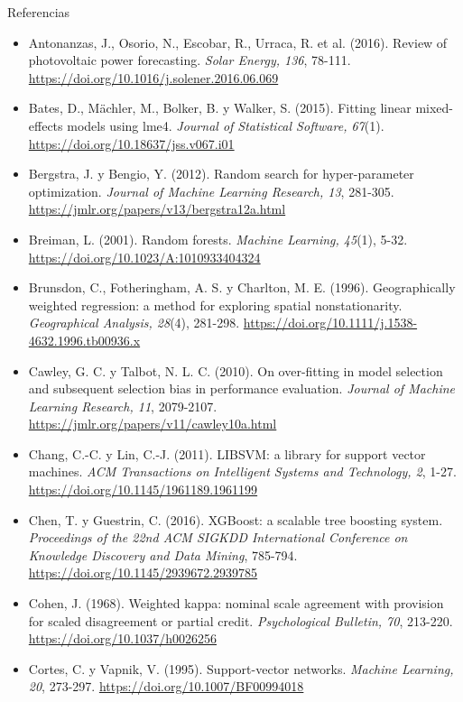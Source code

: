 \documentclass[aspectratio=169,10pt]{beamer}
\begin{document}
\begin{frame}[allowframebreaks]{Referencias}
  \tiny
  \begin{itemize}
    \item Antonanzas, J., Osorio, N., Escobar, R., Urraca, R. et al. (2016). Review of photovoltaic power forecasting. \textit{Solar Energy, 136}, 78-111. \url{https://doi.org/10.1016/j.solener.2016.06.069}
    \item Bates, D., Mächler, M., Bolker, B. y Walker, S. (2015). Fitting linear mixed-effects models using lme4. \textit{Journal of Statistical Software, 67}(1). \url{https://doi.org/10.18637/jss.v067.i01}
    \item Bergstra, J. y Bengio, Y. (2012). Random search for hyper-parameter optimization. \textit{Journal of Machine Learning Research, 13}, 281-305. \url{https://jmlr.org/papers/v13/bergstra12a.html}
    \item Breiman, L. (2001). Random forests. \textit{Machine Learning, 45}(1), 5-32. \url{https://doi.org/10.1023/A:1010933404324}
    \item Brunsdon, C., Fotheringham, A. S. y Charlton, M. E. (1996). Geographically weighted regression: a method for exploring spatial nonstationarity. \textit{Geographical Analysis, 28}(4), 281-298. \url{https://doi.org/10.1111/j.1538-4632.1996.tb00936.x}
    \item Cawley, G. C. y Talbot, N. L. C. (2010). On over-fitting in model selection and subsequent selection bias in performance evaluation. \textit{Journal of Machine Learning Research, 11}, 2079-2107. \url{https://jmlr.org/papers/v11/cawley10a.html}
    \item Chang, C.-C. y Lin, C.-J. (2011). LIBSVM: a library for support vector machines. \textit{ACM Transactions on Intelligent Systems and Technology, 2}, 1-27. \url{https://doi.org/10.1145/1961189.1961199}
    \item Chen, T. y Guestrin, C. (2016). XGBoost: a scalable tree boosting system. \textit{Proceedings of the 22nd ACM SIGKDD International Conference on Knowledge Discovery and Data Mining}, 785-794. \url{https://doi.org/10.1145/2939672.2939785}
    \item Cohen, J. (1968). Weighted kappa: nominal scale agreement with provision for scaled disagreement or partial credit. \textit{Psychological Bulletin, 70}, 213-220. \url{https://doi.org/10.1037/h0026256}
    \item Cortes, C. y Vapnik, V. (1995). Support-vector networks. \textit{Machine Learning, 20}, 273-297. \url{https://doi.org/10.1007/BF00994018}

\end{itemize}
\end{frame}
\end{document}

